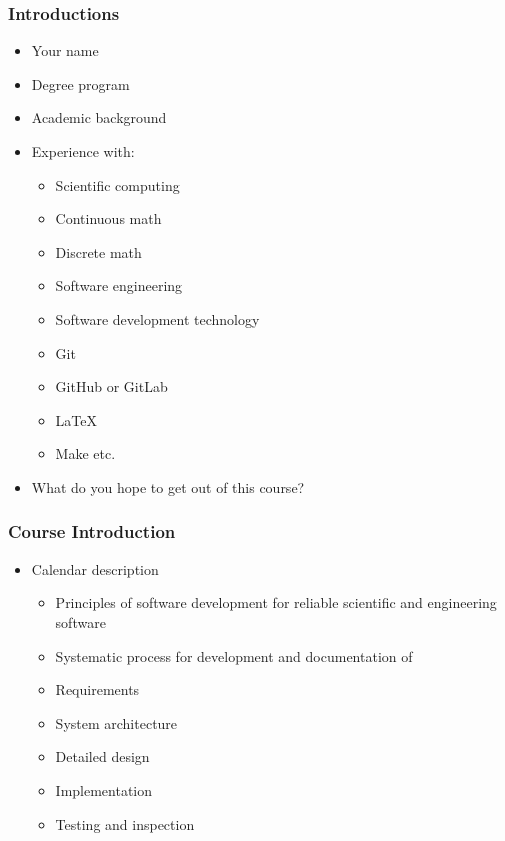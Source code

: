 \documentclass[t,12pt,numbers,fleqn]{beamer}
\begin{document}
\begin{frame}
\frametitle{Introductions}

\begin{itemize}
\item Your name
\item Degree program
\item Academic background
\item Experience with:
\begin{itemize}
\item Scientific computing
\item Continuous math
\item Discrete math
\item Software engineering
\item Software development technology
\bi
\item Git
\item GitHub or GitLab
\item LaTeX
\item Make etc.
\ei
\end{itemize}
\item What do you hope to get out of this course?
\end{itemize}

\end{frame}


\begin{frame}
\frametitle{Course Introduction}

\begin{itemize}
\item Calendar description
\begin{itemize}
\item Principles of software development for reliable scientific and engineering software
\item Systematic process for development and documentation of
\bi
\item Requirements
\item System architecture
\item Detailed design
\item Implementation
\item Testing and inspection
\ei
\end{itemize}
\end{itemize}

\end{frame}
\end{document}
